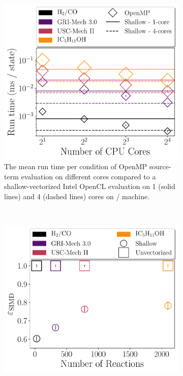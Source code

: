 \documentclass[12pt,number,sort&compress,preprint]{elsarticle}
\begin{document}
\begin{figure}[htbp]
\begin{subfigure}[t]{0.48\linewidth}
      \includegraphics[width=\textwidth]{source_crossover.pdf}
      \caption{The mean run time per condition of OpenMP source-term evaluation on different cores compared to a shallow-vectorized Intel OpenCL evaluation on \num{1} (solid lines) and \num{4} (dashed lines) cores on \avx/ machine.}
      \label{F:source_crossover}
  \end{subfigure}
  \\
  \begin{subfigure}[t]{0.48\linewidth}
      \includegraphics[width=\textwidth]{source_simd_efficiency.pdf}

\end{subfigure}
\end{figure}
\end{document}
